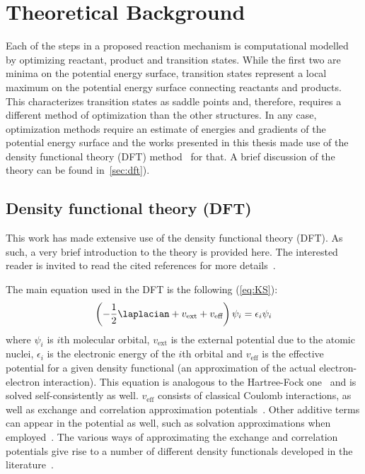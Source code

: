 \section{Theoretical Background}
\label{sec:background-methods}


Each of the steps in a proposed reaction mechanism is computational modelled
by optimizing reactant, product and transition states.
While the first two are minima on the potential energy surface, transition
states represent a local maximum on the potential energy surface connecting
reactants and products.
This characterizes transition states as saddle points and, therefore, requires
a different method of optimization than the other structures.
In any case, optimization methods require an estimate of energies and gradients
of the potential energy surface and the works presented in this thesis made use
of the density functional theory (DFT)
method~\cite{Hohenberg_1964,Kohn_1965,Perdew_2014,Kryachko_2014,Yu_2016} for
that.
A brief discussion of the theory can be found in~\autoref{sec:dft}).

\subsection{Density functional theory (DFT)}\label{sec:dft}

This work has made extensive use of the density functional theory (DFT).
As such, a very brief introduction to the theory is provided here.
The interested reader is invited to read the cited references for more
details~\cite{Hohenberg_1964,Kohn_1965}.

The main equation used in the DFT is the following (\autoref{eq:KS}):
%
\begin{equation}
  \left(-\frac{1}{2} \laplacian
  + v_\text{ext}
  + v_\text{eff}
  \right) \psi_i
  = \epsilon_i \psi_i
  \label{eq:KS}
\end{equation}
%
where $\psi_i$ is $i$th molecular orbital, $v_\text{ext}$ is the external
potential due to the atomic nuclei, $\epsilon_i$ is the electronic energy
of the $i$th orbital and $v_\text{eff}$ is the effective potential for a given
density functional (an approximation of the actual electron-electron
interaction).
This equation is analogous to the Hartree-Fock one~\cite{Szabo_1996}
and is solved self-consistently as well.
$v_\text{eff}$ consists of classical Coulomb interactions, as well as exchange
and correlation approximation
potentials~\cite{Perdew_2014,Kryachko_2014,Yu_2016}.
Other additive terms can appear in the potential as well, such as solvation
approximations when employed~\cite{Marenich_2009,Marenich_2012}.
The various ways of approximating the exchange and correlation potentials give
rise to a number of different density functionals developed in the
literature~\cite{Chai_2008a,Chai_2008b,Goerigk_2011,Arago_2011,Salzner_2011,Burns_2011,Minenkov_2012,DFT2016_poll}.

